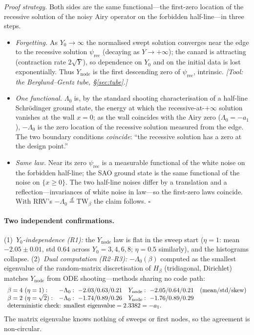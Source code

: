 \documentclass[11pt]{article}
\theoremstyle{remark}
\newcommand{\Ynode}{Y_{\mathrm{node}}}
\newcommand{\TW}{\mathrm{TW}}
\newcommand{\eqd}{\stackrel{d}{=}}
\begin{document}
\noindent\emph{Proof strategy.} Both sides are the same functional---the first-zero
location of the recessive solution of the noisy Airy operator on the forbidden
half-line---in three steps.
\begin{itemize}
\item[\textbf{R1}] \emph{Forgetting.} As $Y_0\to\infty$ the normalised swept solution
converges near the edge to the recessive solution $\psi_{\mathrm{rec}}$ (decaying as
$Y\to+\infty$); the canard is attracting (contraction rate $2\sqrt Y$), so dependence
on $Y_0$ and on the initial data is lost exponentially. Thus $\Ynode$ is the first
descending zero of $\psi_{\mathrm{rec}}$, intrinsic. \emph{[Tool: the Berglund--Gentz
tube, \S\ref{sec:tube}.]}
\item[\textbf{R2}] \emph{One functional.} $\Lambda_0$ is, by the standard shooting
characterisation of a half-line Schr\"odinger ground state, the energy at which the
recessive-at-$+\infty$ solution vanishes at the wall $x=0$; as the wall coincides with
the Airy zero ($\Lambda_0=-a_1$), $-\Lambda_0$ is the zero location of the recessive
solution measured from the edge. The two boundary conditions \emph{coincide}: ``the
recessive solution has a zero at the design point.''
\item[\textbf{R3}] \emph{Same law.} Near its zero $\psi_{\mathrm{rec}}$ is a measurable
functional of the white noise on the forbidden half-line; the SAO ground state is the
same functional of the noise on $\{x\ge0\}$. The two half-line noises differ by a
translation and a reflection---invariances of white noise in law---so the first-zero
laws coincide. With RRV's $-\Lambda_0\eqd\TW_\beta$ the claim follows. \hfill$\square$
\end{itemize}

\paragraph{Two independent confirmations.}
(1)~\emph{$Y_0$-independence (R1):} the $\Ynode$ law is flat in the sweep start
($\eta=1$: mean $-2.05\pm0.01$, std $0.64$ across $Y_0=3,4,6,8$; $\eta=0.5$ similarly),
and the histograms collapse.
(2)~\emph{Dual computation (R2--R3):} $-\Lambda_0(\beta)$ computed as the smallest
eigenvalue of the random-matrix discretisation of $H_\beta$ (tridiagonal, Dirichlet)
matches $\Ynode$ from ODE shooting---methods sharing no code path:
\[
  \begin{array}{lll}
   \beta=4\ (\eta=1):   & -\Lambda_0:\ -2.03/0.63/0.21 & \Ynode:\ -2.05/0.64/0.21\quad(\text{mean/std/skew})\\
   \beta=2\ (\eta=\sqrt2):& -\Lambda_0:\ -1.74/0.89/0.26 & \Ynode:\ -1.76/0.89/0.29\\
   \multicolumn{3}{l}{\text{deterministic check: smallest eigenvalue}=2.3382=-a_1.}
  \end{array}
\]
The matrix eigenvalue knows nothing of sweeps or first nodes, so the agreement is
non-circular.
\end{document}
